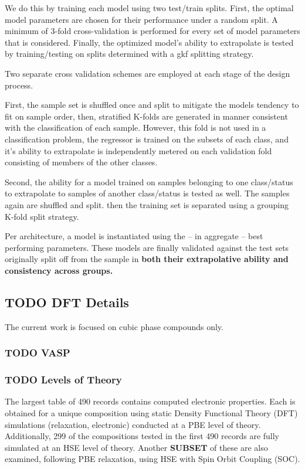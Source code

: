 \documentclass[aip, jmp, amsmath, amssymb]{revtex4-2}
\begin{document}
We do this by training each model using two test/train splits. First,
the optimal model parameters are chosen for their performance under a
random split. A minimum of 3-fold cross-validation is performed for
every set of model parameters that is considered. Finally, the
optimized model's ability to extrapolate is tested by training/testing
on splits determined with a \gls{gkf} splitting strategy.

Two separate cross validation schemes are employed at each stage of
the design process.

First, the sample set is shuffled once and split to mitigate the
models tendency to fit on sample order, then, stratified K-folds are
generated in manner consistent with the classification of each
sample. However, this fold is not used in a classification problem,
the regressor is trained on the subsets of each class, and it's
ability to extrapolate is independently metered on each validation
fold consisting of members of the other classes.

Second, the ability for a model trained on samples belonging to one
class/status to extrapolate to samples of another class/status is
tested as well. The samples again are shuffled and split. then the
training set is separated using a grouping K-fold split strategy.

Per architecture, a model is instantiated using the -- in aggregate --
best performing parameters. These models are finally validated against
the test sets originally split off from the sample in \textbf{both their
extrapolative ability and consistency across groups.}
\subsection*{{\bfseries\sffamily TODO} DFT Details}
\label{sec:orgddfc969}
The current work is focused on cubic phase compounds only.
\subsubsection*{{\bfseries\sffamily TODO} VASP}
\label{sec:org66187c4}

\subsubsection*{{\bfseries\sffamily TODO} Levels of Theory}
\label{sec:org893cd9f}
The largest table of 490 records contains computed electronic
properties. Each is obtained for a unique composition using static
Density Functional Theory (DFT) simulations (relaxation, electronic)
conducted at a PBE level of theory. Additionally, 299 of the
compositions tested in the first 490 records are fully simulated at an
HSE level of theory. Another \textbf{SUBSET} of these are also examined,
following PBE relaxation, using HSE with Spin Orbit Coupling (SOC).
\end{document}
